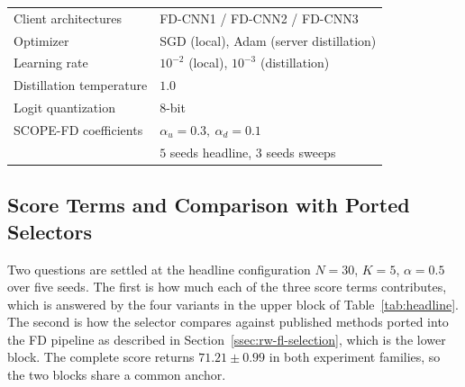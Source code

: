 \documentclass[journal]{IEEEtran}
\newcommand{\rev}[1]{{\color{blue}#1}}
\begin{document}
\begin{table}[t]
\begin{tabular}{@{}>{\raggedright\arraybackslash}m{}>{\raggedright\arraybackslash}m{}@{}}
Client architectures & FD-CNN1 / FD-CNN2 / FD-CNN3 \\
Optimizer & SGD (local), Adam (server distillation) \\
Learning rate & $10^{-2}$ (local), $10^{-3}$ (distillation) \\
Distillation temperature & $1.0$ \\
Logit quantization & $8$-bit \\
SCOPE-FD coefficients & $\alpha_u = 0.3,\ \alpha_d = 0.1$ \\
\rev{Seeds} & \rev{$5$ seeds headline, $3$ seeds sweeps} \\
\bottomrule
\end{tabular}
\end{table}

\subsection{Score Terms and Comparison with Ported Selectors}
\label{ssec:exp-ablation}

\rev{Two questions are settled at the headline configuration $N=30$, $K=5$, $\alpha=0.5$ over five seeds. The first is how much each of the three score terms contributes, which is answered by the four variants in the upper block of Table~\ref{tab:headline}. The second is how the selector compares against published methods ported into the FD pipeline as described in Section~\ref{ssec:rw-fl-selection}, which is the lower block. The complete score returns $71.21 \pm 0.99$ in both experiment families, so the two blocks share a common anchor.}
\end{document}
